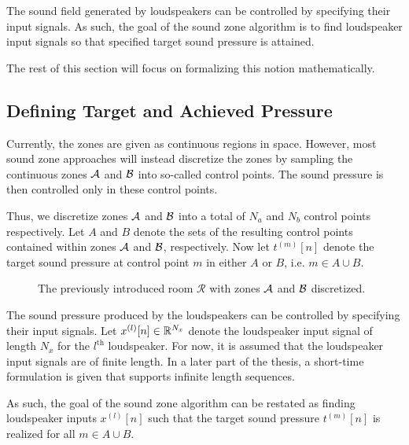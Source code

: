 The sound field generated by loudspeakers can be controlled by specifying their input signals.
As such, the goal of the sound zone algorithm is to find loudspeaker input signals so that specified target sound pressure is attained.

The rest of this section will focus on formalizing this notion mathematically.

\subsection{Defining Target and Achieved Pressure}
\label{ch:sound_zone:data_model:target_pressure}
Currently, the zones are given as continuous regions in space.
However, most sound zone approaches will instead discretize the zones by sampling the continuous zones 
$\mathcal{A}$ and $\mathcal{B}$ into so-called control points.
The sound pressure is then controlled only in these control points.

Thus, we discretize zones $\mathcal{A}$ and $\mathcal{B}$ into a total of $N_a$ and $N_b$ control points respectively.   
Let $A$ and $B$ denote the sets of the resulting control points contained within zones $\mathcal{A}$ and $\mathcal{B}$, respectively.
Now let $t^{(m)}[n]$ denote the target sound pressure at control point $m$ in either $A$ or $B$, i.e. $m\in A \cup B$.

\begin{figure}
    \centering
    
    \caption{The previously introduced room $\mathcal{R}$ with zones $\mathcal{A}$ and $\mathcal{B}$ discretized.}
\end{figure}

The sound pressure produced by the loudspeakers can be controlled by specifying their input signals.
Let $x^{(l)}[n]\in\mathbb{R}^{N_x}$ denote the loudspeaker input signal of length $N_x$ for the $l^\text{th}$ loudspeaker.
For now, it is assumed that the loudspeaker input signals are of finite length. 
In a later part of the thesis, a short-time formulation is given that supports infinite length sequences. 

As such, the goal of the sound zone algorithm can be restated as finding loudspeaker inputs $x^{(l)}[n]$ 
such that the target sound pressure $t^{(m)}[n]$ is realized for all $m\in A \cup B$.

